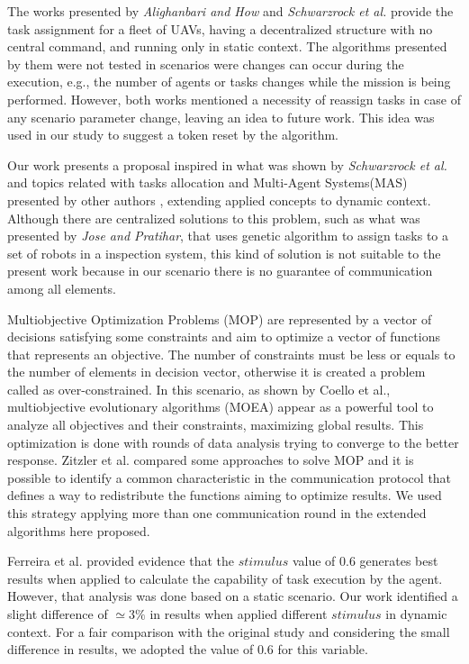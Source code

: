 The works presented by \textit{Alighanbari and How}\cite{alighanbari2005decentralized} and \textit{Schwarzrock et al.}\cite{MAS07} provide the task assignment for a fleet of UAVs, having a decentralized structure with no central command, and running only in static context. The algorithms presented by them were not tested in scenarios were changes can occur during the execution, e.g., the number of agents or tasks changes while the mission is being performed. However, both works mentioned a necessity of reassign tasks in case of any scenario parameter change, leaving an idea to future work. This idea was used in our study to suggest a token reset by the algorithm.

Our work presents a proposal inspired in what was shown by \textit{Schwarzrock et al.}\cite{MAS07} and topics related with tasks allocation and Multi-Agent Systems(MAS) presented by other authors \cite{MAS01, MAS02, MAS03, MAS04, MAS05, MAS06}, extending applied concepts to dynamic context. Although there are centralized solutions to this problem, such as what was presented by \textit{Jose and Pratihar}\cite{jose2016task}, that uses genetic algorithm to assign tasks to a set of robots in a inspection system, this kind of solution is not suitable to the present work because in our scenario there is no guarantee of communication among all elements.

Multiobjective Optimization Problems (MOP) are represented by a vector of decisions satisfying some constraints and aim to optimize a vector of functions that represents an objective. The number of constraints must be less or equals to the number of elements in decision vector, otherwise it is created a problem called as over-constrained. In this scenario, as shown by Coello et al.\cite{MOEA01},  multiobjective evolutionary algorithms (MOEA) appear as a powerful tool to analyze all objectives and their constraints, maximizing global results. This optimization is done with rounds of data analysis trying to converge to the better response. Zitzler et al.\cite{07} compared some approaches to solve MOP and it is possible to identify a common characteristic in the communication protocol that defines a way to redistribute the functions aiming to optimize results. We used this strategy applying more than one communication round in the extended algorithms here proposed.

Ferreira et al. \cite{ferreira2007swarm} provided evidence that the $stimulus$ value of $0.6$ generates best results when applied to calculate the capability of task execution by the agent. However, that analysis was done based on a static scenario. Our work identified a slight difference of $\simeq 3\%$ in results when applied different $stimulus$ in dynamic context. For a fair comparison with the original study \cite{MAS07} and considering the small difference in results, we adopted the value of $0.6$ for this variable.

